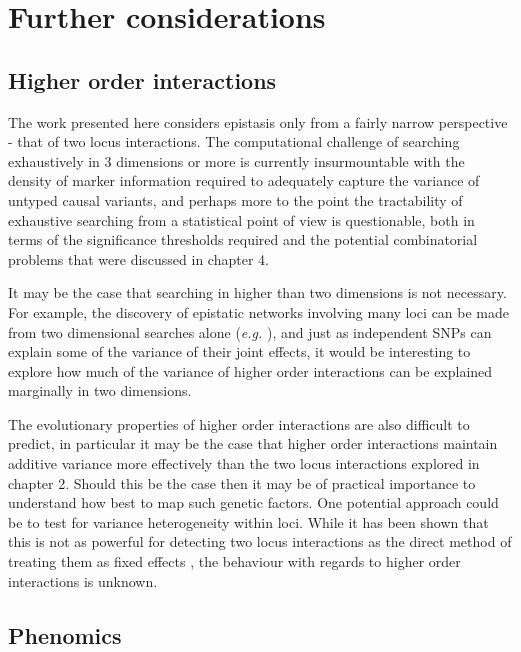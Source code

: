 \section{Further considerations}

\subsection{Higher order interactions}

The work presented here considers epistasis only from a fairly narrow perspective - that of two locus interactions. The computational challenge of searching exhaustively in 3 dimensions or more is currently insurmountable with the density of marker information required to adequately capture the variance of untyped causal variants, and perhaps more to the point the tractability of exhaustive searching from a statistical point of view is questionable, both in terms of the significance thresholds required and the potential combinatorial problems that were discussed in chapter 4.

It may be the case that searching in higher than two dimensions is not necessary. For example, the discovery of epistatic networks involving many loci can be made from two dimensional searches alone (\emph{e.g.} \citet{Carlborg2006}), and just as independent SNPs can explain some of the variance of their joint effects, it would be interesting to explore how much of the variance of higher order interactions can be explained marginally in two dimensions.

The evolutionary properties of higher order interactions are also difficult to predict, in particular it may be the case that higher order interactions maintain additive variance more effectively than the two locus interactions explored in chapter 2. Should this be the case then it may be of practical importance to understand how best to map such genetic factors. One potential approach could be to test for variance heterogeneity within loci. While it has been shown that this is not as powerful for detecting two locus interactions as the direct method of treating them as fixed effects \citep{Struchalin2010}, the behaviour with regards to higher order interactions is unknown. 


\subsection{Phenomics}

